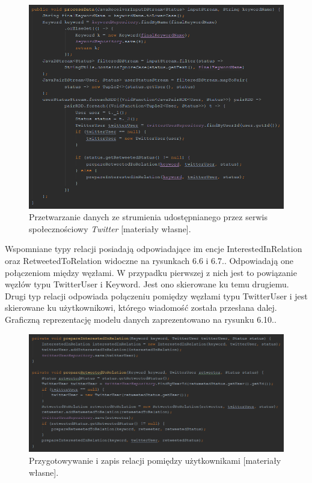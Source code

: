 \begin{figure}[h] %
	\centering
	\includegraphics[width=1.0\linewidth]{img/twitter_analyser_process_data}
	\caption{Przetwarzanie danych ze strumienia udostępnianego przez serwis społecznościowy \textit{Twitter} [materiały własne].}
\end{figure}

Wspomniane typy relacji posiadają odpowiadające im encje InterestedInRelation oraz RetweetedToRelation widoczne na rysunkach 6.6 i 6.7.. Odpowiadają one połączeniom między węzłami. W przypadku pierwszej z nich jest to powiązanie węzłów typu TwitterUser i Keyword. Jest ono skierowane ku temu drugiemu. Drugi typ relacji odpowiada połączeniu pomiędzy węzłami typu TwitterUser i jest skierowane ku użytkownikowi, którego wiadomość została przesłana dalej. Graficzną reprezentację modelu danych zaprezentowano na rysunku 6.10..

\begin{figure}[h] %
	\centering
	\includegraphics[width=1.0\linewidth]{img/twitter_analyser_process_data_2}
	\caption{Przygotowywanie i zapis relacji pomiędzy użytkownikami [materiały własne].}
\end{figure}

